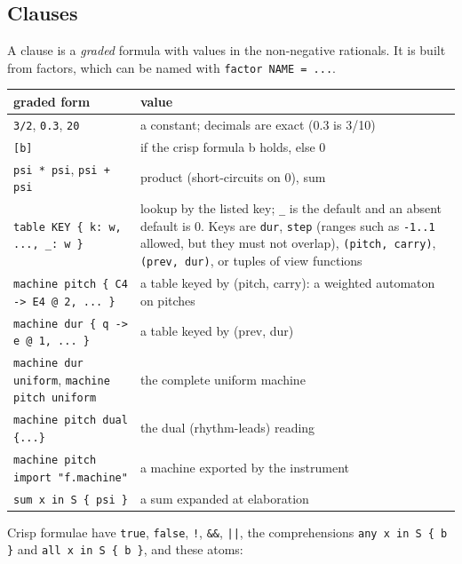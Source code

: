 \documentclass[11pt,a4paper]{article}
\newcommand{\ttx}[1]{\texttt{#1}}
\begin{document}
\subsection{Clauses}\label{ssec:clauses}

A clause is a \emph{graded} formula with values in the non-negative rationals.
It is built from factors, which can be named with \ttx{factor NAME = ...}.

\begin{center}
\small
\begin{tabularx}{\linewidth}{@{}l>{\raggedright\arraybackslash}X@{}}
\toprule
graded form & value \\
\midrule
\ttx{3/2}, \ttx{0.3}, \ttx{20} & a constant; decimals are exact (0.3 is 3/10) \\
\ttx{[b]} & 1 if the crisp formula b holds, else 0 \\
\ttx{psi * psi}, \ttx{psi + psi} & product (short-circuits on 0), sum \\
\ttx{table KEY \{ k: w, ..., \_: w \}} & lookup by the listed key; \ttx{\_} is the
  default and an absent default is 0. Keys are \ttx{dur}, \ttx{step} (ranges
  such as \ttx{-1..1} allowed, but they must not overlap), \ttx{(pitch,
  carry)}, \ttx{(prev, dur)}, or tuples of view functions \\
\ttx{machine pitch \{ C4 -> E4 @ 2, ... \}} & a table keyed by (pitch, carry):
  a weighted automaton on pitches \\
\ttx{machine dur \{ q -> e @ 1, ... \}} & a table keyed by (prev, dur) \\
\ttx{machine dur uniform}, \ttx{machine pitch uniform} & the complete uniform
  machine \\
\ttx{machine pitch dual \{...\}} & the dual (rhythm-leads) reading \\
\ttx{machine pitch import "f.machine"} & a machine exported by the instrument \\
\ttx{sum x in S \{ psi \}} & a sum expanded at elaboration \\
\bottomrule
\end{tabularx}
\end{center}

\noindent Crisp formulae have \ttx{true}, \ttx{false}, \ttx{!}, \ttx{\&\&},
\ttx{||}, the comprehensions \ttx{any x in S \{ b \}} and \ttx{all x in S \{ b
\}}, and these atoms:
\end{document}
